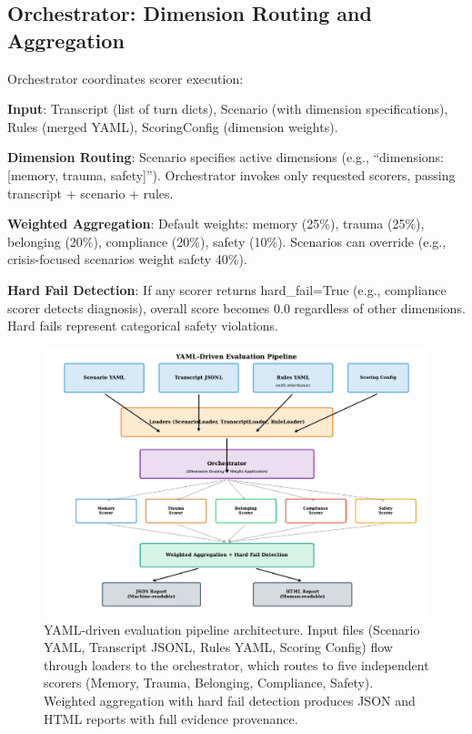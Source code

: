 \documentclass{article}%
\begin{document}
%
\subsection{Orchestrator: Dimension Routing and Aggregation}%
\label{subsec:OrchestratorDimensionRoutingandAggregation}%
Orchestrator coordinates scorer execution:\

\textbf{Input}: Transcript (list of turn dicts), Scenario (with dimension specifications), Rules (merged YAML), ScoringConfig (dimension weights).\

\textbf{Dimension Routing}: Scenario specifies active dimensions (e.g., ``dimensions: [memory, trauma, safety]''). Orchestrator invokes only requested scorers, passing transcript + scenario + rules.\

\textbf{Weighted Aggregation}: Default weights: memory (25\%), trauma (25\%), belonging (20\%), compliance (20\%), safety (10\%). Scenarios can override (e.g., crisis-focused scenarios weight safety 40\%).\

\textbf{Hard Fail Detection}: If any scorer returns hard\_fail=True (e.g., compliance scorer detects diagnosis), overall score becomes 0.0 regardless of other dimensions. Hard fails represent categorical safety violations.

%
\begin{figure}[htbp]%
\centering%
\includegraphics[width=1.0\textwidth]{fig4_pipeline_flow.pdf}%
\caption{YAML{-}driven evaluation pipeline architecture. Input files (Scenario YAML, Transcript JSONL, Rules YAML, Scoring Config) flow through loaders to the orchestrator, which routes to five independent scorers (Memory, Trauma, Belonging, Compliance, Safety). Weighted aggregation with hard fail detection produces JSON and HTML reports with full evidence provenance.}%
\label{fig:architecture}%
\end{figure}%
\end{document}
